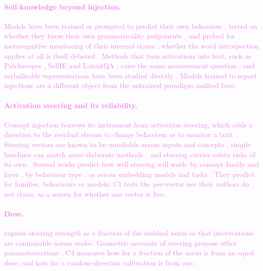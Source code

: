 \documentclass[11pt,a4paper]{article}
\newcommand{\draft}[1]{\textcolor{violet}{#1}}
\begin{document}
\draft{\paragraph{Self-knowledge beyond injection.} Models have been trained or prompted to predict
their own behaviour \citep{binder2024looking,zeng2026selfmodeling}, tested on whether they know their
own grammaticality judgements \citep{song2025fail}, and probed for metacognitive monitoring of their
internal states \citep{jian2025metacognitive}; whether the word introspection applies at all is
itself debated \citep{comsa2025introspection}. Methods that turn activations into text, such as
Patchscopes \citep{ghandeharioun2024patchscopes}, SelfIE \citep{chen2024selfie} and LatentQA
\citep{pan2024latentqa}, raise the same measurement question \citep{li2025verbalization}, and
verbalisable representations have been studied directly \citep{gurnee2026verbalizable}. Models
trained to report injections \citep{fonsecarivera2025awareness,hahami2026ift} are a different object
from the untrained paradigm audited here.}

\draft{\paragraph{Activation steering and its reliability.} Concept injection borrows its instrument
from activation steering, which adds a direction to the residual stream to change behaviour
\citep{turner2023actadd,rimsky2024caa,zou2023repe} or to monitor a trait \citep{chen2025persona}.
Steering vectors are known to be unreliable across inputs and concepts
\citep{tan2024generalisation,braun2025unreliability,dasilva2025steering}, simple baselines can match
more elaborate methods \citep{wu2025axbench}, and steering carries safety risks of its
own \citep{safetypitfalls2026}. Several works predict how well steering will work: by concept
family and layer \citep{billa2026predicting}, by behaviour type \citep{bas2025whatcan}, or across
embedding models and tasks \citep{canary2026}. They predict for families, behaviours or models; C1
tests the per-vector use their authors do not claim, as a screen for whether one vector is live.}

\draft{\paragraph{Dose.} \citet{wu2026steerable} express steering strength as a fraction of the
residual norm so that interventions are comparable across scales. Geometric accounts of steering propose other
parameterisations \citep{anglenorm2026,riemannian2026}. C4 measures how far a fraction of the norm is
from an equal dose, and how far a random-direction calibration is from one.}
\end{document}
